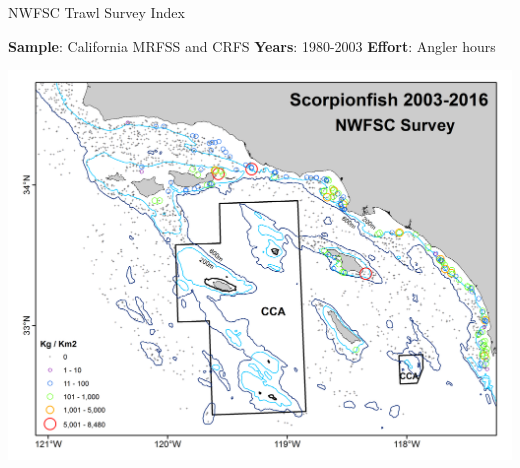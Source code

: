 \documentclass[ignorenonframetext,]{beamer}
\begin{document}
\begin{frame}{NWFSC Trawl Survey Index}

\textbf{Sample}: California MRFSS and CRFS \textbf{Years}: 1980-2003
\textbf{Effort}: Angler hours

\includegraphics[height=.7\textheight]{Figures/NWFSCtrawl_map.png}

\end{frame}
\end{document}
